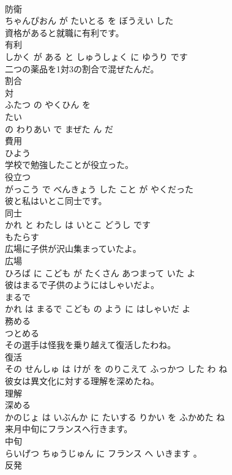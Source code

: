 \documentclass[8pt]{extreport}
\begin{document}
\begin{CJK}{UTF8}{min}
\\	防衛 
\\	ちゃんぴおん が たいとる を ぼうえい した			
\\	資格があると就職に有利です。	
\\	有利 
\\	しかく が ある と しゅうしょく に ゆうり です			
\\	二つの薬品を1対3の割合で混ぜたんだ。	
\\	割合 
\\	対 
\\	ふたつ の やくひん を 
\\	たい 
\\	の わりあい で まぜた ん だ			
\\	費用	
\\	ひよう		
\\	学校で勉強したことが役立った。	
\\	役立つ 
\\	がっこう で べんきょう した こと が やくだった			
\\	彼と私はいとこ同士です。	
\\	同士 
\\	かれ と わたし は いとこ どうし です			
\\	もたらす	
\\	広場に子供が沢山集まっていたよ。	
\\	広場 
\\	ひろば に こども が たくさん あつまって いた よ			
\\	彼はまるで子供のようにはしゃいだよ。	
\\	まるで 
\\	かれ は まるで こども の よう に はしゃいだ よ			
\\	務める	
\\	つとめる		
\\	その選手は怪我を乗り越えて復活したわね。	
\\	復活 
\\	その せんしゅ は けが を のりこえて ふっかつ した わ ね			
\\	彼女は異文化に対する理解を深めたね。	
\\	理解 
\\	深める 
\\	かのじょ は いぶんか に たいする りかい を ふかめた ね			
\\	来月中旬にフランスへ行きます。	
\\	中旬 
\\	らいげつ ちゅうじゅん に フランス へ いきます 。			
\\	反発	

\end{CJK}
\end{document}
